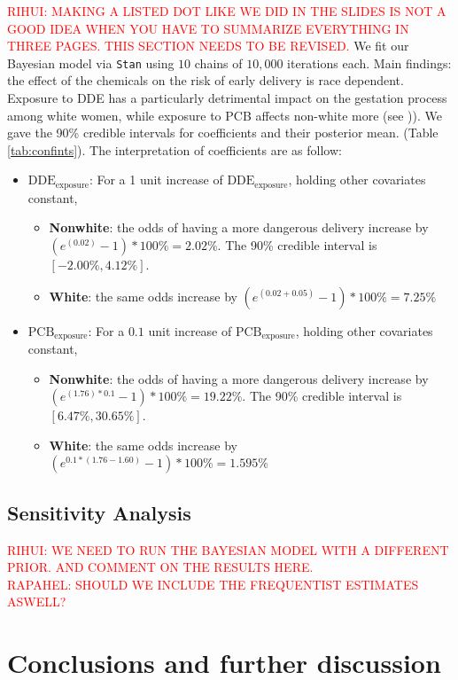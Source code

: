 \documentclass[10pt]{jmlr}%
\begin{document}
\textcolor{red}{RIHUI: MAKING A LISTED DOT LIKE WE DID IN THE SLIDES IS NOT A GOOD IDEA WHEN YOU HAVE TO SUMMARIZE EVERYTHING IN THREE PAGES. THIS SECTION NEEDS TO BE REVISED.}
We fit our Bayesian model via {\tt Stan} using $10$ chains of $10,000$ iterations each.
Main findings: the effect of the chemicals on the risk of early delivery is race dependent. Exposure to DDE has a particularly detrimental impact on the gestation process among white women, while exposure to PCB affects non-white more (see )).
We gave the 90\% credible intervals for coefficients and their posterior mean. (Table \ref{tab:confints}). The interpretation of coefficients are as follow:
\begin{itemize}
	\item $\text{DDE}_{\text{exposure}}$: For a 1 unit increase of $\text{DDE}_{\text{exposure}}$, holding other covariates constant,
		    \begin{itemize}
		    	\item \textbf{Nonwhite}: the odds of having a more dangerous delivery increase by $(e^{(0.02)}-1)*100\%=2.02\%$. The 90\% credible interval is $[-2.00\%, 4.12\%]$.
		    	\item \textbf{White}:  the same odds increase by $(e^{(0.02+0.05)}-1)*100\%=7.25\%$
		    \end{itemize}
	\item $\text{PCB}_{\text{exposure}}$: For a $0.1$ unit increase of $\text{PCB}_{\text{exposure}}$, holding other covariates constant,
			\begin{itemize}
				\item \textbf{Nonwhite}: the odds of having a more dangerous delivery increase by $(e^{(1.76)*0.1}-1)*100\%=19.22\%$. The 90\% credible interval is $[6.47\%,30.65\%]$.
				\item \textbf{White}:  the same odds increase by $(e^{0.1*(1.76-1.60)}-1)*100\%=1.595\%$
			\end{itemize}
\end{itemize}

\subsection{Sensitivity Analysis}
\textcolor{red}{RIHUI: WE NEED TO RUN THE BAYESIAN MODEL WITH A DIFFERENT PRIOR. AND COMMENT ON THE RESULTS HERE. \\
RAPAHEL: SHOULD WE INCLUDE THE FREQUENTIST ESTIMATES ASWELL?}
\section{Conclusions and further discussion}
\label{sec:conclusion}
\end{document}

